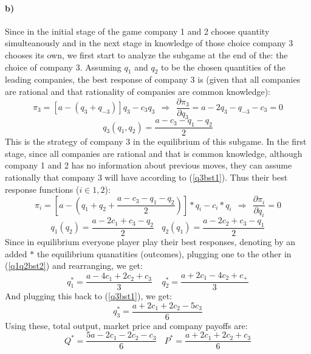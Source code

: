 \documentclass[10pt,a4paper]{article}
\begin{document}
\paragraph*{b)}
Since in the initial stage of the game company 1 and 2 choose quantity simulteanously and in the next stage in knowledge of those choice company 3 chooses its own, we first start to analyze the subgame at the end of the: the choice of company 3. Assuming $q_1$ and $q_2$ to be the chosen quantities of the leading companies, the best response of company 3 is (given that all companies are rational and that rationality of companies are common knowledge):
\begin{equation}
	\label{co3profitb}
	\pi_3 = [a - (q_3 + q_{-3})] q_3 - c_3 q_3 ~~ \Rightarrow ~~ \frac{\partial \pi_3}{\partial q_3} = a-2q_3-q_{-3}-c_3=0
\end{equation}
\begin{equation}
	\label{q3bst1}
	q_3(q_1,q_2) = \frac{a-c_3-q_1-q_2}{2}
\end{equation}
This is the strategy of company 3 in the equilibrium of this subgame.
In the first stage, since all companies are rational and that is common knowledge, although company 1 and 2 has no information about previous moves, they can assume rationally that company 3 will have according to (\ref{q3bst1}). Thus their best response functions ($i \in {1,2}$):
\begin{equation}
	\pi_i = [a-(q_1+q_2+\frac{a-c_3-q_1-q_2}{2})]*q_i-c_i*q_i ~~ \Rightarrow ~~ \frac{\partial \pi_i}{\partial q_i} = 0
\end{equation}
\begin{equation}
	\label{q1q2bst2}
	q_1(q_2) = \frac{a-2c_1+c_3-q_2}{2} ~~~~ q_2(q_1) = \frac{a-2c_2+c_3-q_1}{2}
\end{equation}
Since in equilibrium everyone player play their best responses, denoting by an added $*$ the equilibrium quanatities (outcomes), plugging one to the other in (\ref{q1q2bst2}) and rearranging, we get:
\begin{equation}
	q_1^* = \frac{a-4c_1+2c_2+c_3}{3} ~~~~~ q_2^* = \frac{a+2c_1-4c_2+c_+}{3}
\end{equation}
And plugging this back to (\ref{q3bst1}), we get:
\begin{equation}
	q_3^* = \frac{a+2c_1+2c_2-5c_3}{6}	
\end{equation}
Using these, total output, market price and company payoffs are:
\begin{equation}
	Q^* = \frac{5 a-2 c_1-2 c_2-c_3}{6} ~~~~ P^* = \frac{a+2 c_1+2 c_2+c_3}{6}
\end{equation}
\end{document}

